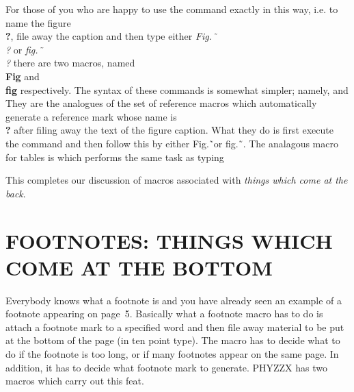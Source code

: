 For those of you who are happy to use the command exactly in this
way, i.e. to name the figure {\bf \\?}, file away the caption
and then type either {\it Fig.\~\ \\?} or {\it fig.\~\ \\?}
there are two macros, named {\bf \\Fig} and {\bf \\fig}
respectively.
The syntax of these commands is somewhat simpler; namely,
and
They are the analogues of the set of reference macros which
automatically generate a reference mark whose name is {\bf \\?}
after filing away the text of the figure caption.
What they do is first execute the command \nextline
{}
and then follow this by either Fig.\~\ or fig.\~\ .
The analagous macro for tables is
which performs the same task as typing
 
This completes our discussion of macros associated with {\it things
which come at the back}.
 
\chapter{FOOTNOTES: THINGS WHICH COME AT THE BOTTOM}
 
Everybody knows what a footnote is and you have already seen an
example of a footnote appearing on page~5.
Basically what a footnote macro has to do is
attach a footnote mark to a specified word and then
file away material to be put at the bottom of the page
(in ten point type).
The macro has to decide what to do if the footnote is too long,
or if many footnotes appear on the same page.
In addition, it has to decide what footnote mark to generate.
PHYZZX has two macros which carry out this feat.
 
